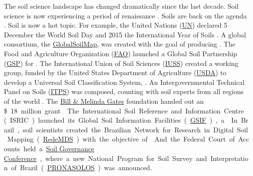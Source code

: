 The soil science landscape has changed dramatically since the last decade. Soil science is now 
experiencing a period of renaissance \cite{HarteminkEtAl2008}. Soils are back on the agenda 
\cite{Kempen2011}. Soil is now a hot topic. For example, the United Nations 
(\href{http://www.un.org/apps/news/story.asp?NewsID=49520#.VnremV6alz0}{UN}) declared 5 December 
the World Soil Day and 2015 the International Year of Soils . A global consortium, the 
\href{http://www.globalsoilmap.net/}{GlobalSoilMap}, was created with the goal of producing 
. 
The Food and Agriculture Organization (\href{http://www.fao.org/index_en.htm}{FAO}) launched a 
Global Soil Partnership (\href{http://www.fao.org/globalsoilpartnership/}{GSP}) for 
. The International 
Union of Soil Sciences (\href{http://www.iuss.org/index.php?article_id=525}{IUSS}) created a working group,
funded by the United States Department of Agriculture 
(\href{http://www.nrcs.usda.gov/wps/portal/nrcs/main/soils/survey/class/}{USDA}) to develop a 
Universal Soil Classification System, . An Intergovernmental Technical Panel on Soils 
(\href{http://www.fao.org/globalsoilpartnership/intergovernmental-technical-panel-on-soils/}{ITPS})
was composed, counting with soil experts from all regions of the world .
The \href{http://www.gatesfoundation.org/what-we-do/global-development/agricultural-development}{Bill 
\& Melinda Gates} foundation handed out an \SI{18}[\$]~million grant . The International Soil 
Reference and Information Centre (ISRIC) launched its Global Soil Information Facilities 
(\href{http://www.isric.org/projects/global-soil-information-facilities-gsif}{GSIF}), a 
. In Brazil, soil scientists created the 
Brazilian Network for Research in Digital Soil Mapping (\href{https://goo.gl/m8QWUm}{RedeMDS}) with 
the objective of . And the Federal Court of Accounts held a 
\href{https://www.governancadosolo.gov.br/}{Soil Governance Conference}, where a new National 
Program for Soil Survey and Interpretation of Brazil (\href{https://goo.gl/zbMK24}{PRONASOLOS}) was 
announced.

